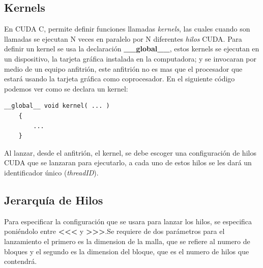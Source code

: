 \subsection{Kernels}

En CUDA C, permite definir funciones llamadas \textit{kernels}, las cuales cuando son llamadas se ejecutan N veces en paralelo por N diferentes \textit{hilos} CUDA. Para definir un kernel se usa la declaración \textbf{\_\_global\_\_}, estos kernels se ejecutan en un dispositivo, la tarjeta gráfica instalada en la computadora; y se invocaran por medio de un equipo anfitrión, este anfitrión no es mas que el procesador que estará usando la tarjeta gráfica como coprocesador. En el siguiente código podemos ver como se declara un kernel: 

\begin{lstlisting}[caption=Declaración de un Kernel en CUDA C.]
	__global__ void kernel( ... )
    {
   		...
    }

\end{lstlisting}

Al lanzar, desde el anfitrión, el kernel, se debe escoger una configuración de hilos CUDA que se lanzaran para ejecutarlo, a cada uno de estos hilos se les dará un identificador único (\textit{threadID}). 

\subsection{Jerarquía de Hilos}

Para especificar la configuración que se usara para lanzar los hilos, se especifica poniéndolo entre \textbf{\textless\textless\textless} y \textbf{\textgreater\textgreater\textgreater}.Se requiere de dos parámetros para el lanzamiento el primero es la dimension de la malla, que se refiere al numero de bloques y el segundo es la dimension del bloque, que es el numero de hilos que contendrá. 


